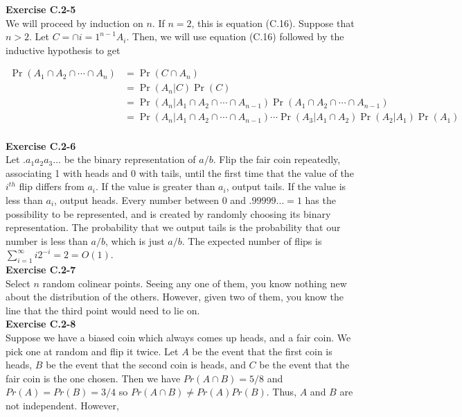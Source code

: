 \documentclass{article}
\begin{document}
\noindent\textbf{Exercise C.2-5}\\

We will proceed by induction on $n$. If $n=2$, this is equation (C.16). Suppose that $n>2$. Let $C = \cap{i=1}^{n-1} A_i$. Then, we will use equation (C.16) followed by the inductive hypothesis to get

\begin{align*}
\Pr(A_1 \cap A_2 \cap \cdots \cap A_n) &= \Pr(C \cap A_n)\\
&= \Pr(A_n | C) \Pr(C)\\
&= \Pr(A_n | A_1 \cap A_2 \cap \cdots \cap A_{n-1}) \Pr( A_1 \cap A_2 \cap \cdots \cap A_{n-1})\\
&= \Pr(A_n | A_1 \cap A_2 \cap \cdots \cap A_{n-1}) \cdots \Pr(A_3 | A_1 \cap A_2)\Pr(A_2 | A_1) \Pr(A_1)\\
\end{align*}

\noindent\textbf{Exercise C.2-6}\\

Let $.a_1a_2a_3\ldots$ be the binary representation of $a/b$.  Flip the fair coin repeatedly, associating 1 with heads and 0 with tails, until the first time that the value of the $i^{th}$ flip differs from $a_i$.  If the value is greater than $a_i$, output tails.  If the value is less than $a_i$, output heads.  Every number between 0 and $.99999\ldots = 1$ has the possibility to be represented, and is created by randomly choosing its binary representation.  The probability that we output tails is the probability that our number is less than $a/b$, which is just $a/b$.  The expected number of flips is $\sum_{i=1}^\infty i2^{-i} = 2 = O(1)$. \\

\noindent\textbf{Exercise C.2-7}\\

Select $n$ random colinear points. Seeing any one of them, you know nothing new about the distribution of the others. However, given two of them, you know the line that the third point would need to lie on.\\


\noindent\textbf{Exercise C.2-8}\\

Suppose we have a biased coin which always comes up heads, and a fair coin.  We pick one at random and flip it twice.  Let $A$ be the event that the first coin is heads, $B$ be the event that the second coin is heads, and $C$ be the event that the fair coin is the one chosen.  Then we have $Pr(A \cap B) = 5/8$ and $Pr(A) = Pr(B) = 3/4$ so $Pr(A \cap B) \neq Pr(A)Pr(B)$.  Thus, $A$ and $B$ are not independent.  However, 
\end{document}
